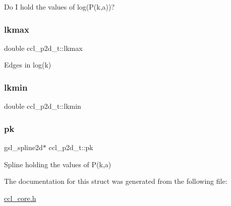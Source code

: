Do I hold the values of log(\+P(k,a))? \mbox{\label{structccl__p2d__t_aa95658067bf981859e38846ae8231f8f}} 
\subsubsection{\texorpdfstring{lkmax}{lkmax}}
{\footnotesize\ttfamily double ccl\+\_\+p2d\+\_\+t\+::lkmax}

Edges in log(k) \mbox{\label{structccl__p2d__t_a955661f32b72852c9bc7dfee5428c759}} 
\subsubsection{\texorpdfstring{lkmin}{lkmin}}
{\footnotesize\ttfamily double ccl\+\_\+p2d\+\_\+t\+::lkmin}

\mbox{\label{structccl__p2d__t_a4355819df1b2cb5302e149729d2b2c58}} 
\subsubsection{\texorpdfstring{pk}{pk}}
{\footnotesize\ttfamily gsl\+\_\+spline2d$\ast$ ccl\+\_\+p2d\+\_\+t\+::pk}

Spline holding the values of P(k,a) 

The documentation for this struct was generated from the following file\+:\begin{DoxyCompactItemize}
\item 
\mbox{\hyperlink{ccl__core_8h}{ccl\+\_\+core.\+h}}\end{DoxyCompactItemize}
